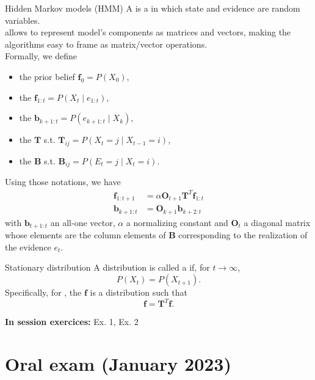 \documentclass[11pt, a4paper]{article}
\begin{document}
\newpage

\begin{thbox}{Hidden Markov models (HMM)}
    A  is a  in which state and evidence are  random variables.\\

     allows to represent model's components as matrices and vectors, making the algorithms easy to frame as matrix/vector operations.\\

    Formally, we define
    \begin{itemize}
        \item the prior belief $\mathbf{f}_0 = P(X_0)$,
        \item the  $\mathbf{f}_{1:t} = P(X_t\mid e_{1:t})$,
        \item the  $\mathbf{b}_{k+1:t} = P(e_{k+1:t}\mid X_k)$,
        \item the  $\mathbf{T}$ s.t. $\mathbf{T}_{ij} = P(X_t = j\mid X_{t-1} = i)$,
        \item the  $\mathbf{B}$ s.t. $\mathbf{B}_{ij} = P(E_t = j\mid X_t = i)$.
    \end{itemize}
    Using those notations, we have
    \begin{align*}
    \mathbf{f}_{1:t+1} &= \alpha \mathbf{O}_{t+1}\mathbf{T}^T\mathbf{f}_{1:t}\\
    \mathbf{b}_{k+1:t} &= \mathbf{O}_{k+1}\mathbf{b}_{k+2:t}
    \end{align*}
    with $\mathbf{b}_{t+1:t}$ an all-one vector, $\alpha$ a normalizing constant and $\mathbf{O}_t$ a diagonal matrix whose elements are the column elements of $\mathbf{B}$ corresponding to the realization of the evidence $e_t$.
\end{thbox}

\begin{thbox}{Stationary distribution}
    A distribution is called a  if, for $t \to \infty$,
    $$P(X_t) = P(X_{t + 1}).$$
    Specifically, for , the  $\mathbf{f}$ is a distribution such that
    $$\mathbf{f} = \mathbf{T}^T\mathbf{f}.$$
\end{thbox}
\textbf{In session exercices:} Ex. 1, Ex. 2
\newpage 

\section{Oral exam (January 2023)}
\end{document}
